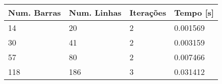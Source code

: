 \begin{tabular}{|l|l|l|l|}
\hline
\textbf{Num. Barras}&\textbf{Num. Linhas}&\textbf{Iterações}&\textbf{Tempo [s]}\\\hline
14&20&2&0.001569\\\hline
30&41&2&0.003159\\\hline
57&80&2&0.007466\\\hline
118&186&3&0.031412\\\hline
\end{tabular}
